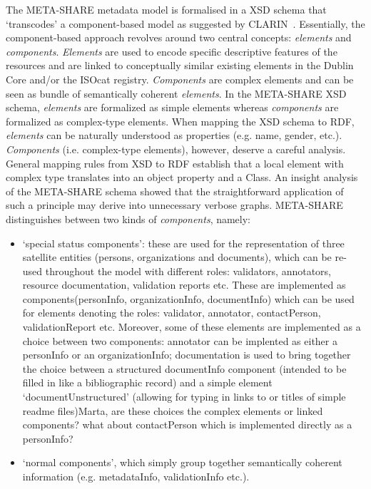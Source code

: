 \documentclass{llncs}
\begin{document}
{The META-SHARE metadata model is formalised in a XSD schema that `transcodes' a component-based model as suggested by CLARIN~\cite{broeder2012cmdi}. Essentially, the component-based approach revolves around two central concepts: \emph{elements} and \emph{components}. \emph{Elements} are used to encode specific descriptive features of the resources and are linked to conceptually similar existing elements in the Dublin Core and/or the ISOcat registry. \emph{Components} are complex elements and can be seen as bundle of semantically coherent \emph{elements}.
In the META-SHARE XSD schema, \emph{elements} are formalized as simple elements whereas \emph{components} are formalized as complex-type elements. When mapping the XSD schema to RDF, \emph{elements} can be naturally understood as properties (e.g. name, gender, etc.). \emph{Components} (i.e. complex-type elements), however, deserve a careful analysis. General mapping rules from XSD to RDF establish that a local element with complex type translates into an object property and a Class. An insight analysis of the META-SHARE schema showed that the straightforward application of such a principle may derive into unnecessary verbose graphs.
META-SHARE distinguishes between two kinds of \emph{components}, namely:
\begin{itemize}
\item `special status components': these are used for the representation of
    three satellite entities (persons, organizations and documents), which can
    be re-used throughout the model with different roles: validators,
    annotators, resource documentation, validation reports etc. These are
    implemented as components(personInfo, organizationInfo, documentInfo) which
    can be used for elements denoting the roles: validator, annotator,
    contactPerson, validationReport etc. Moreover, some of these elements are
    implemented as a choice between two components: annotator can be implented
    as either a personInfo or an organizationInfo; documentation is used to
    bring together the choice between a structured documentInfo component
    (intended to be filled in like a bibliographic record) and a simple element
    `documentUnstructured' (allowing for typing in links to or titles of simple readme files){Marta, are these choices the complex elements or linked components? what about contactPerson which is implemented directly as a personInfo?}
\item `normal components', which simply group together semantically coherent information (e.g. metadataInfo, validationInfo etc.).

\end{itemize}}
\end{document}
